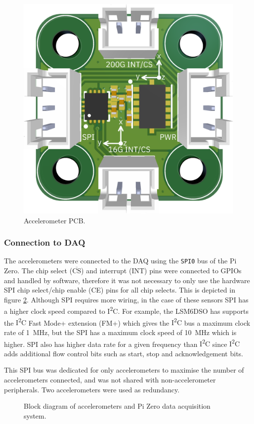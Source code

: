 \documentclass{report}
\newcommand{\textoverline}[1]{$\overline{\mbox{#1}}$}
\newcommand{\iic}{{I\textsuperscript{2}C}}
\begin{document}
\begin{figure}[H]
  \centering
  \includegraphics[width=0.5\linewidth]{images/Accelerometers_PCB.png}
  \caption{Accelerometer PCB.}
  \label{fig:accelerometers-pcb}
\end{figure}

\subsubsection{Connection to DAQ}

The accelerometers were connected to the DAQ using the \texttt{SPI0} bus of the Pi Zero. The chip select (\textoverline{CS}) and interrupt (INT) pins were connected to GPIOs and handled by software, therefore it was not necessary to only use the hardware SPI chip select/chip enable (CE) pins for all chip selects. This is depicted in figure \ref{fig:accelerometers-sch-block}. Although SPI requires more wiring, in the case of these sensors SPI has a higher clock speed compared to {\iic}. For example, the LSM6DSO has supports the {\iic} Fast Mode+ extension (FM+) which gives the {\iic} bus a maximum clock rate of \SI{1}{\mega\hertz}, but the SPI has a maximum clock speed of \SI{10}{\mega\hertz} which is higher. SPI also has higher data rate for a given frequency than {\iic} since {\iic} adds additional flow control bits such as start, stop and acknowledgement bits.

This SPI bus was dedicated for only accelerometers to maximise the number of accelerometers connected, and was not shared with non-accelerometer peripherals. Two accelerometers were used as redundancy.

\begin{figure}[H]
  \centering
  
  \caption{Block diagram of accelerometers and Pi Zero data acquisition system.}
  \label{fig:accelerometers-sch-block}
\end{figure}
\end{document}
